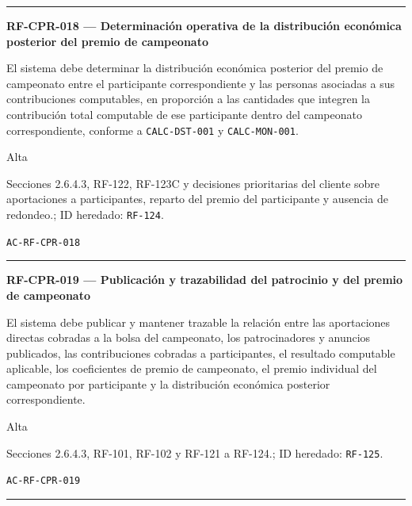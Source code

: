 \documentclass[10pt,letterpaper]{article}
\begin{document}
\vspace{0.25em}\hrule\vspace{0.65em}
\noindent\textbf{RF-CPR-018 --- Determinación operativa de la distribución económica posterior del premio de campeonato}\par
\begin{description}[style=nextline,leftmargin=3.15cm,labelwidth=2.8cm,font=\normalfont\bfseries]
\item[Obligación] El sistema debe determinar la distribución económica posterior del premio de campeonato entre el participante correspondiente y las personas asociadas a sus contribuciones computables, en proporción a las cantidades que integren la contribución total computable de ese participante dentro del campeonato correspondiente, conforme a \texttt{CALC-DST-001} y \texttt{CALC-MON-001}.
\item[Prioridad] Alta
\item[Procedencia] Secciones 2.6.4.3, RF-122, RF-123C y decisiones prioritarias del cliente sobre aportaciones a participantes, reparto del premio del participante y ausencia de redondeo.; ID heredado: \texttt{RF-124}.
\item[Verificación] \texttt{AC-RF-CPR-018}
\end{description}
\vspace{0.25em}\hrule\vspace{0.65em}
\noindent\textbf{RF-CPR-019 --- Publicación y trazabilidad del patrocinio y del premio de campeonato}\par
\begin{description}[style=nextline,leftmargin=3.15cm,labelwidth=2.8cm,font=\normalfont\bfseries]
\item[Obligación] El sistema debe publicar y mantener trazable la relación entre las aportaciones directas cobradas a la bolsa del campeonato, los patrocinadores y anuncios publicados, las contribuciones cobradas a participantes, el resultado computable aplicable, los coeficientes de premio de campeonato, el premio individual del campeonato por participante y la distribución económica posterior correspondiente.
\item[Prioridad] Alta
\item[Procedencia] Secciones 2.6.4.3, RF-101, RF-102 y RF-121 a RF-124.; ID heredado: \texttt{RF-125}.
\item[Verificación] \texttt{AC-RF-CPR-019}
\end{description}
\vspace{0.25em}\hrule\vspace{0.65em}
\end{document}
